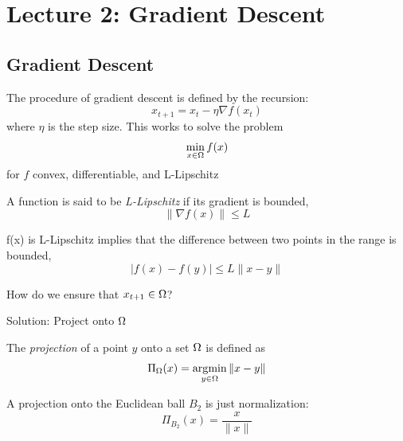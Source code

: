 \section{Lecture 2: Gradient Descent}

\subsection{Gradient Descent}


The procedure of gradient descent is defined by the recursion:
\[
x_{t+1} = x_t - \eta \nabla f(x_t)
\]
where $\eta$ is the step size. This works to solve the problem
\[
\min_{x\in\Omega} f(x)
\]
for $f$ convex, differentiable, and L-Lipschitz

\begin{definition}[L-Lipschitz]
A function is said to be \emph{L-Lipschitz} if its gradient is bounded,
\[
\|\nabla f(x)\| \leq L
\]
\end{definition}

\begin{fact}
f(x) is L-Lipschitz implies that the difference between two points in the range is bounded,
\[
|f(x) - f(y)| \leq L \|x - y\|
\]
\end{fact}

\begin{question}
How do we ensure that $x_{t+1}\in\Omega$?
\end{question}

Solution: Project onto $\Omega$

\begin{definition}[Projection]
The \emph{projection} of a point $y$ onto a set $\Omega$ is defined as
\[
\Pi_{\Omega}(x) = \operatorname*{\arg\!\min}_{y\in\Omega} \|x-y\|
\]
\end{definition}

\begin{example}
A projection onto the Euclidean ball $B_2$ is just normalization:
\[
\Pi_{B_2}(x) = \dfrac{x}{\|x\|}
\]
\end{example}

